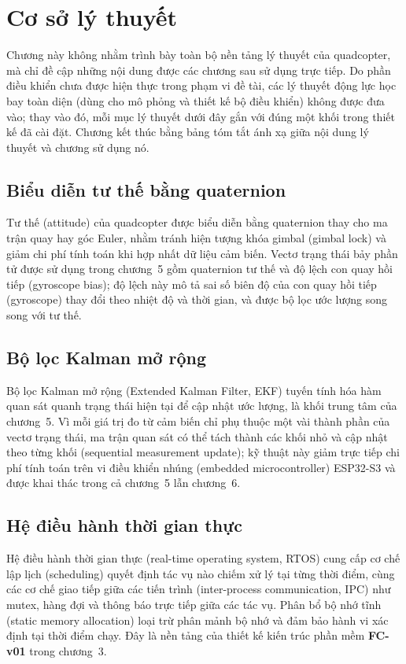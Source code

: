 \chapter{Cơ sở lý thuyết}

Chương này không nhằm trình bày toàn bộ nền tảng lý thuyết của quadcopter, mà chỉ đề cập những nội dung được các chương sau sử dụng trực tiếp. Do phần điều khiển chưa được hiện thực trong phạm vi đề tài, các lý thuyết động lực học bay toàn diện (dùng cho mô phỏng và thiết kế bộ điều khiển) không được đưa vào; thay vào đó, mỗi mục lý thuyết dưới đây gắn với đúng một khối trong thiết kế đã cài đặt. Chương kết thúc bằng bảng tóm tắt ánh xạ giữa nội dung lý thuyết và chương sử dụng nó.

\section{Biểu diễn tư thế bằng quaternion}

Tư thế (attitude) của quadcopter được biểu diễn bằng quaternion thay cho ma trận quay hay góc Euler, nhằm tránh hiện tượng khóa gimbal (gimbal lock) và giảm chi phí tính toán khi hợp nhất dữ liệu cảm biến. Vectơ trạng thái bảy phần tử được sử dụng trong chương~5 gồm quaternion tư thế và độ lệch con quay hồi tiếp (gyroscope bias); độ lệch này mô tả sai số biên độ của con quay hồi tiếp (gyroscope) thay đổi theo nhiệt độ và thời gian, và được bộ lọc ước lượng song song với tư thế.

\section{Bộ lọc Kalman mở rộng}

Bộ lọc Kalman mở rộng (Extended Kalman Filter, EKF) tuyến tính hóa hàm quan sát quanh trạng thái hiện tại để cập nhật ước lượng, là khối trung tâm của chương~5. Vì mỗi giá trị đo từ cảm biến chỉ phụ thuộc một vài thành phần của vectơ trạng thái, ma trận quan sát có thể tách thành các khối nhỏ và cập nhật theo từng khối (sequential measurement update); kỹ thuật này giảm trực tiếp chi phí tính toán trên vi điều khiển nhúng (embedded microcontroller) ESP32-S3 và được khai thác trong cả chương~5 lẫn chương~6.

\section{Hệ điều hành thời gian thực}

Hệ điều hành thời gian thực (real-time operating system, RTOS) cung cấp cơ chế lập lịch (scheduling) quyết định tác vụ nào chiếm xử lý tại từng thời điểm, cùng các cơ chế giao tiếp giữa các tiến trình (inter-process communication, IPC) như mutex, hàng đợi và thông báo trực tiếp giữa các tác vụ. Phân bổ bộ nhớ tĩnh (static memory allocation) loại trừ phân mảnh bộ nhớ và đảm bảo hành vi xác định tại thời điểm chạy. Đây là nền tảng của thiết kế kiến trúc phần mềm \textbf{FC-v01} trong chương~3.

